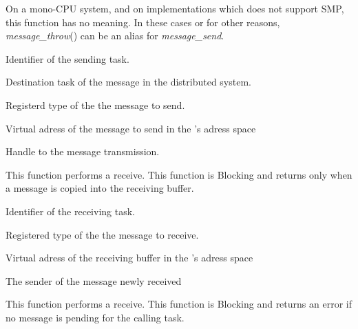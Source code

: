 \begin{itemize}
{	   On a mono-CPU system, and on implementations which does not
	   support SMP, this function has no meaning. In these cases or for
	   other reasons, \textit{message\_throw}() can be an alias for
	   \textit{message\_send}.

	   \item {}

	     Identifier of the sending task.

	   \item {}

	     Destination task of the message in the distributed system.

	   \item {}

	     Registerd type of the the message to send.

	   \item {}

	     Virtual adress of the message to send in the
	     's adress space

	   \item {}

	     Handle to the message transmission.
	 }

	 {
	   This function performs a receive. This function is Blocking and
	   returns only when a message is copied into the receiving buffer.

	   \item {}

	     Identifier of the receiving task.

	   \item {}

	     Registered type of the the message to receive.

	   \item {}

	     Virtual adress of the receiving buffer in the
	     's adress space

	   \item {}

	     The sender of the message newly received
	 }

	 {
	   This function performs a receive. This function is Blocking and
	   returns an error if no message is pending for the calling task.

}
\end{itemize}
